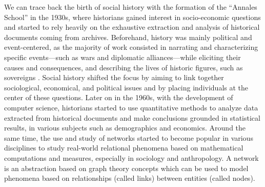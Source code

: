 We can trace back the birth of social history with the formation of the ``Annales School'' in the 1930s, where historians gained interest in socio-economic questions and started to rely heavily on the exhaustive extraction and analysis of historical documents coming from archives\cite{blochApologiePourHistoire1949, prost2014}.
Beforehand, history was mainly political and event-centered, as the majority of work consisted in narrating and characterizing specific events---such as wars and diplomatic alliances---while eliciting their causes and consequences, and describing the lives of historic figures, such as sovereigns \cite{prost2014}.
Social history shifted the focus by aiming to link together sociological, economical, and political issues and by placing individuals at the center of these questions\cite{tilly1984retrieving}.
Later on in the 1960s, with the development of computer science, historians started to use quantitative methods to analyze data extracted from historical documents and make conclusions grounded in statistical results, in various subjects such as demographics\cite{henryRegistresParoissiauxHistoire1956} and economics\cite{goldinCliometricsNobel1995}.
Around the same time, the use and study of networks started to become popular in various disciplines to study real-world relational phenomena based on mathematical computations and measures, especially in sociology and anthropology\cite{cConceptUseSocial1969}.
A network is an abstraction based on graph theory concepts which can be used to model phenomena based on relationships (called links) between entities (called nodes).

